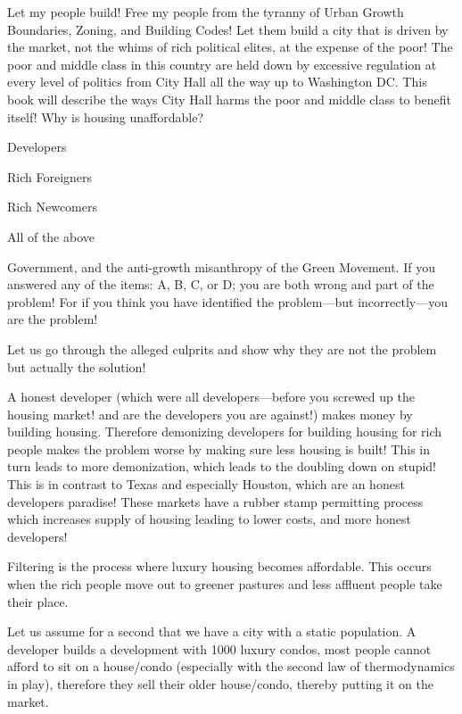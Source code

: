 \startchapter[title={Let My People Build!}]
\startsection[title={Let My People Build!}]
Let my people build!
Free my people from the tyranny of Urban Growth Boundaries, Zoning, and Building Codes!
Let them build a city that is driven by the market, not the whims of rich political elites, at the expense of the poor!
The poor and middle class in this country are held down by excessive regulation at every level of politics from  City Hall all the way up to Washington DC.
This book will describe the ways City Hall harms the poor and middle class to benefit itself!
\stopsection
\startsection[title={Why is housing unaffordable?}]
Why is housing unaffordable?
\startitemize[A]
\item Developers
\item Rich Foreigners
\item Rich Newcomers
\item All of the above
\item Government, and the anti-growth misanthropy of the Green Movement.
\stopitemize
If you answered any of the items: A, B, C, or D; you are both wrong and part of the problem!
For if you think you have identified the problem---but incorrectly---you are the problem!

Let us go through the alleged culprits and show why they are not the problem but actually the solution!

\startsection[title={The Housing Lifecycle}]
A honest developer (which were all developers---before you screwed up the housing market! and are the developers you are against!) makes money by building housing.
Therefore demonizing developers for building housing for rich people makes the problem worse by making sure less housing is built! This in turn leads to more demonization, which leads to the doubling down on stupid!
This is in contrast to Texas and especially Houston, which are an honest developers paradise!
These markets have a rubber stamp permitting process which increases supply of housing leading to lower costs, and more honest developers!

Filtering is the process where luxury housing becomes affordable.
This occurs when the rich people move out to greener pastures and less affluent people take their place.

Let us assume for a second that we have a city with a static population. A developer builds a development with 1000 luxury condos, most people cannot afford to sit on a house/condo (especially with the second law of thermodynamics in play), therefore they sell their older house/condo, thereby putting it on the market.
\stopchapter
